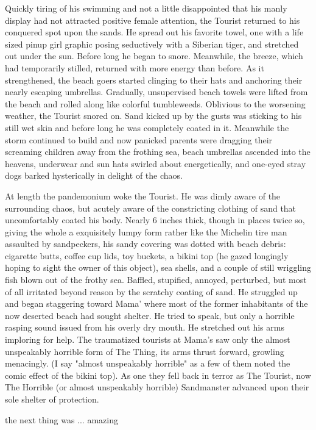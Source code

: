 \documentclass[10pt,twoside,openright]{memoir}
\begin{document}
Quickly tiring of his swimming and not a little disappointed that his manly display had not attracted positive female attention, the Tourist returned to his conquered spot upon the sands. He spread out his favorite towel, one with a life sized pinup girl graphic posing seductively with a Siberian tiger, and stretched out under the sun. Before long he began to snore. Meanwhile, the breeze, which had temporarily stilled, returned with more energy than before. As it strengthened, the beach goers started clinging to their hats and anchoring their nearly escaping umbrellas. Gradually, unsupervised beach towels were lifted from the beach and rolled along like colorful tumbleweeds. Oblivious to the worsening weather, the Tourist snored on. Sand kicked up by the gusts was sticking to his still wet skin and before long he was completely coated in it. Meanwhile the storm continued to build and now panicked parents were dragging their screaming children away from the frothing sea, beach umbrellas ascended into the heavens, underwear and sun hats swirled about energetically, and one-eyed stray dogs barked hysterically in delight of the chaos.

At length the pandemonium woke the Tourist.  He was dimly aware of the surrounding chaos, but acutely aware of the constricting clothing of sand that uncomfortably coated his body.  Nearly 6 inches thick, though in places twice so, giving the whole a exquisitely lumpy form rather like the Michelin tire man assaulted by sandpeckers, his sandy covering was dotted with beach debris: cigarette butts, coffee cup lids, toy buckets, a bikini top (he gazed longingly hoping to sight the owner of this object), sea shells, and a couple of still wriggling fish blown out of the frothy sea.  Baffled, stupified, annoyed, perturbed, but most of all irritated beyond reason by the scratchy coating of sand.  He struggled up and began staggering toward Mama' where most of the former inhabitants of the now deserted beach had sought shelter.  He tried to speak, but only a horrible rasping sound issued from his overly dry mouth.  He stretched out his arms imploring for help.  The traumatized tourists at Mama's saw only the almost unspeakably horrible form of The Thing, its arms thrust forward, growling menacingly.  (I say "almost unspeakably horrible" as a few of them noted the comic effect of the bikini top).  As one they fell back in terror as The Tourist, now The Horrible (or almost unspeakably horrible) Sandmanster advanced upon their sole shelter of protection.

the next thing was ... amazing
\end{document}

